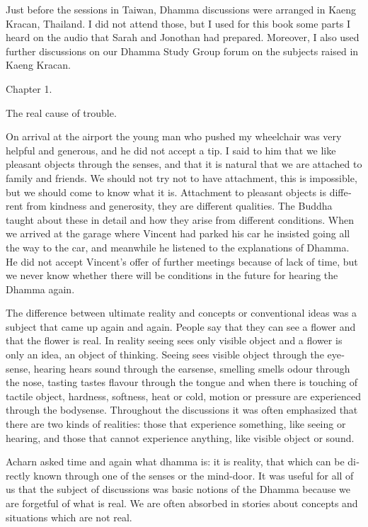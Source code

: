 \textdutch{Just before the sessions in Taiwan, Dhamma discussions were
arranged in Kaeng Kracan, Thailand. I did not attend those, but I used
for this book some parts I heard on the audio that Sarah and Jonothan
had prepared. Moreover, I also used further discussions on our Dhamma
Study Group forum on the subjects raised in Kaeng Kracan. }

\textdutch{Chapter 1.}

\textdutch{The real cause of trouble.}

\textdutch{On arrival at the airport the young man who pushed my
wheelchair was very helpful and generous, and he did not accept a tip. I
said to him that we like pleasant objects through the senses, and that
it is natural that we are attached to family and friends. We should not
try not to have attachment, this is impossible, but we should come to
know what it is. Attachment to pleasant objects is different from
kindness and generosity, they are different qualities. The Buddha taught
about these in detail and how they arise from different conditions. When
we arrived at the garage where Vincent had parked his car he insisted
going all the way to the car, and meanwhile he listened to the
explanations of Dhamma. He did not accept Vincent's offer of further
meetings because of lack of time, but we never know whether there will
be conditions in the future for hearing the Dhamma again. }

\textdutch{The difference between ultimate reality and concepts or
conventional ideas was a subject that came up again and again. People
say that they can see a flower and that the flower is real. In reality
seeing sees only visible object and a flower is only an idea, an object
of thinking. Seeing sees visible object through the eyesense, hearing
hears sound through the earsense, smelling smells odour through the
nose, tasting tastes flavour through the tongue and when there is
touching of tactile object, hardness, softness, heat or cold, motion or
pressure are experienced through the bodysense. Throughout the
discussions it was often emphasized that there are two kinds of
realities: those that experience something, like seeing or hearing, and
those that cannot experience anything, like visible object or sound. }

\textdutch{Acharn asked time and again what dhamma is: it is reality,
that which can be directly known through one of the senses or the
mind-door. It was useful for all of us that the subject of discussions
was basic notions of the Dhamma because we are forgetful of what is
real. We are often absorbed in stories about concepts and situations
which are not real. }

